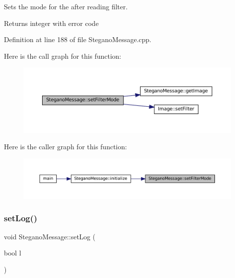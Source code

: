 Sets the mode for the after reading filter. 

\begin{DoxyReturn}{Returns}
integer with error code 
\end{DoxyReturn}


Definition at line 188 of file Stegano\+Message.\+cpp.

Here is the call graph for this function\+:
\nopagebreak
\begin{figure}[H]
\begin{center}
\leavevmode
\includegraphics[width=350pt]{classSteganoMessage_a5c3ef910b17f4bbe32a73a33be9d7586_cgraph}
\end{center}
\end{figure}
Here is the caller graph for this function\+:
\nopagebreak
\begin{figure}[H]
\begin{center}
\leavevmode
\includegraphics[width=350pt]{classSteganoMessage_a5c3ef910b17f4bbe32a73a33be9d7586_icgraph}
\end{center}
\end{figure}
\mbox{\label{classSteganoMessage_a438e9d5189a8e3b83021fada4a6a469c}} 
\subsubsection{\texorpdfstring{setLog()}{setLog()}}
{\footnotesize\ttfamily void Stegano\+Message\+::set\+Log (\begin{DoxyParamCaption}\item[{bool}]{l }\end{DoxyParamCaption})}



